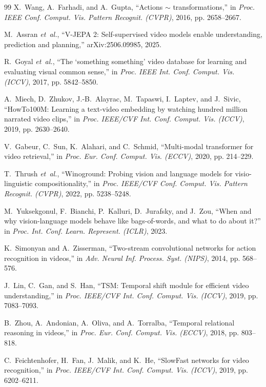 \documentclass[lettersize,journal]{IEEEtran}
\begin{document}
\begin{thebibliography}{99}
X.~Wang, A.~Farhadi, and A.~Gupta, ``Actions $\sim$ transformations,'' in
\textit{Proc. IEEE Conf. Comput. Vis. Pattern Recognit. (CVPR)}, 2016,
pp. 2658--2667.

M.~Assran \textit{et~al.}, ``V-JEPA 2: Self-supervised video models enable
understanding, prediction and planning,'' arXiv:2506.09985, 2025.

R.~Goyal \textit{et~al.}, ``The `something something' video database for
learning and evaluating visual common sense,'' in \textit{Proc. IEEE Int.
Conf. Comput. Vis. (ICCV)}, 2017, pp. 5842--5850.

A.~Miech, D.~Zhukov, J.-B.~Alayrac, M.~Tapaswi, I.~Laptev, and J.~Sivic,
``HowTo100M: Learning a text-video embedding by watching hundred million
narrated video clips,'' in \textit{Proc. IEEE/CVF Int. Conf. Comput. Vis.
(ICCV)}, 2019, pp. 2630--2640.

V.~Gabeur, C.~Sun, K.~Alahari, and C.~Schmid, ``Multi-modal transformer for
video retrieval,'' in \textit{Proc. Eur. Conf. Comput. Vis. (ECCV)}, 2020,
pp. 214--229.

T.~Thrush \textit{et~al.}, ``Winoground: Probing vision and language models
for visio-linguistic compositionality,'' in \textit{Proc. IEEE/CVF Conf.
Comput. Vis. Pattern Recognit. (CVPR)}, 2022, pp. 5238--5248.

M.~Yuksekgonul, F.~Bianchi, P.~Kalluri, D.~Jurafsky, and J.~Zou, ``When and
why vision-language models behave like bags-of-words, and what to do about
it?'' in \textit{Proc. Int. Conf. Learn. Represent. (ICLR)}, 2023.

K.~Simonyan and A.~Zisserman, ``Two-stream convolutional networks for action
recognition in videos,'' in \textit{Adv. Neural Inf. Process. Syst. (NIPS)},
2014, pp. 568--576.

J.~Lin, C.~Gan, and S.~Han, ``TSM: Temporal shift module for efficient video
understanding,'' in \textit{Proc. IEEE/CVF Int. Conf. Comput. Vis. (ICCV)},
2019, pp. 7083--7093.

B.~Zhou, A.~Andonian, A.~Oliva, and A.~Torralba, ``Temporal relational
reasoning in videos,'' in \textit{Proc. Eur. Conf. Comput. Vis. (ECCV)}, 2018,
pp. 803--818.

C.~Feichtenhofer, H.~Fan, J.~Malik, and K.~He, ``SlowFast networks for video
recognition,'' in \textit{Proc. IEEE/CVF Int. Conf. Comput. Vis. (ICCV)},
2019, pp. 6202--6211.


\end{thebibliography}
\end{document}
